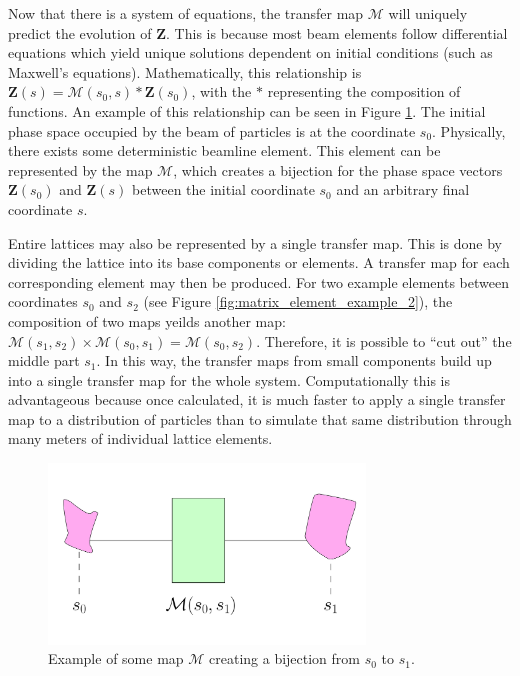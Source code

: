 Now that there is a system of equations, the transfer map $\mathcal{M}$ will uniquely predict the evolution of $\mathbf{Z}$. This is because most beam elements follow differential equations which yield unique solutions dependent on initial conditions (such as Maxwell's equations). Mathematically, this relationship is $\mathbf{Z}(s)=\mathcal{M}(s_0 , s)*\mathbf{Z}(s_0)$, with the $*$ representing the composition of functions. An example of this relationship can be seen in Figure \ref{fig:matrix_element_example_1}. The initial phase space occupied by the beam of particles is at the coordinate $s_0$. Physically, there exists some deterministic beamline element. This element can be represented by the map $\mathcal{M}$, which creates a bijection for the phase space vectors $\mathbf{Z}(s_0)$ and $\mathbf{Z}(s)$ between the initial coordinate $s_0$ and an arbitrary final coordinate $s$. 

Entire lattices may also be represented by a single transfer map. This is done by dividing the lattice into its base components or elements. A transfer map for each corresponding element may then be produced. For two example elements between coordinates $s_0$ and $s_2$ (see Figure \ref{fig:matrix_element_example_2}), the composition of two maps yeilds another map: $\mathcal{M}(s_1 , s_2)\times \mathcal{M}(s_0 , s_1) = \mathcal{M}(s_0 , s_2)$.  Therefore, it is possible to ``cut out'' the middle part $s_1$. In this way, the transfer maps from small components build up into a single transfer map for the whole system. Computationally this is advantageous because once calculated, it is much faster to apply a single transfer map to a distribution of particles than to simulate that same distribution through many meters of individual lattice elements.

\begin{figure}[h!]
  \centering
    \includegraphics[width=0.75\textwidth]{Figures/matrix_element_example_1} 
  \caption{Example of some map $\mathcal{M}$ creating a bijection from $s_0$ to $s_1$.}
  \label{fig:matrix_element_example_1}
\end{figure}

